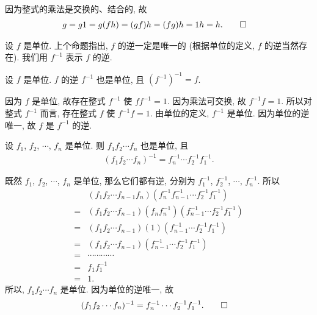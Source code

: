 \begin{pf}
    因为整式的乘法是交换的、结合的, 故
    \begin{align*}
         & g = g1 = g(fh) = (gf)h = (fg)h = 1h = h. \qedhere
    \end{align*}
\end{pf}

\begin{definition}
    设 $f$ 是单位. 上个命题指出, $f$ 的逆一定是唯一的 (根据单位的定义, $f$ 的逆当然存在). 我们用 $f^{-1}$ 表示 $f$ 的逆.
\end{definition}

\begin{proposition}
    设 $f$ 是单位. $f$ 的逆 $f^{-1}$ 也是单位, 且 $(f^{-1})^{-1} = f$.
\end{proposition}

\begin{pf}
    因为 $f$ 是单位, 故存在整式 $f^{-1}$ 使 $ff^{-1} = 1$. 因为乘法可交换, 故 $f^{-1} f = 1$. 所以对整式 $f^{-1}$ 而言, 存在整式 $f$ 使 $f^{-1} f = 1$. 由单位的定义, $f^{-1}$ 是单位. 因为单位的逆唯一, 故 $f$ 是 $f^{-1}$ 的逆.
\end{pf}

\begin{proposition}
    设 $f_1$, $f_2$, $\cdots$, $f_n$ 是单位. 则 $f_1 f_2 \cdots f_n$ 也是单位, 且
    \begin{align*}
        (f_1 f_2 \cdots f_n)^{-1} = f_n^{-1} \cdots f_2^{-1} f_1^{-1}.
    \end{align*}
\end{proposition}

\begin{pf}
    既然 $f_1$, $f_2$, $\cdots$, $f_n$ 是单位, 那么它们都有逆, 分别为 $f_1^{-1}$, $f_2^{-1}$, $\cdots$, $f_n^{-1}$. 所以
    \begin{align*}
             & (f_1 f_2 \cdots f_{n-1} f_n) (f_n^{-1} f_{n-1}^{-1} \cdots f_2^{-1} f_1^{-1})   \\
        = {} & (f_1 f_2 \cdots f_{n-1}) (f_n f_n^{-1}) (f_{n-1}^{-1} \cdots f_2^{-1} f_1^{-1}) \\
        = {} & (f_1 f_2 \cdots f_{n-1}) (1) (f_{n-1}^{-1} \cdots f_2^{-1} f_1^{-1})            \\
        = {} & (f_1 f_2 \cdots f_{n-1}) (f_{n-1}^{-1} \cdots f_2^{-1} f_1^{-1})                \\
        = {} & \cdots \cdots \cdots \cdots                                                     \\
        = {} & f_1 f_1^{-1}                                                                    \\
        = {} & 1.
    \end{align*}
    所以, $f_1 f_2 \cdots f_n$ 是单位. 因为单位的逆唯一, 故
    \begin{align*}
         & (f_1 f_2 \cdots f_n)^{-1} = f_n^{-1} \cdots f_2^{-1} f_1^{-1}. \qedhere
    \end{align*}
\end{pf}

